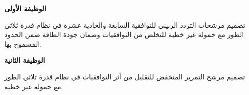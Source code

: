 \documentclass[12pt, a4paper, twoside]{article}
\begin{document}

\clearpage

\newpage
\thispagestyle{empty}
\mbox{}
\newpage

\pagestyle{introstyle} %



\clearpage
\thispagestyle{empty} %
\cleardoublepage     %

\pagestyle{mainstyle}
{
\newpage 
{}
\thispagestyle{empty}
\vfill
{\vspace*{130pt}\fontsize{55}{80}\selectfont
\textbf{الوظيفة الأولى} \label{part1}
}\\[40pt]
{\fontsize{20}{30}\selectfont
تصميم مرشحات التردد الرنيني  للتوافقية السابعة والحادية عشرة في نظام قدرة ثلاثي الطور مع حمولة غير خطية للتخلص من التوافقيات وضمان جودة الطاقة ضمن الحدود المسموح بها.
\par}
\vfill
\newpage
}




{
\newpage
{}
\thispagestyle{empty}
\vfill
{\vspace*{130pt}\fontsize{55}{80}\selectfont
\textbf{الوظيفة الثانية} \label{part2}
}\\[40pt]
{\fontsize{20}{30}\selectfont
تصميم مرشح التمرير المنخفض  للتقليل من أثر التوافقيات في نظام قدرة ثلاثي الطور مع حمولة غير خطية.
\par}
\vfill
\newpage
\par}

\setcounter{section}{0} 





\end{document}

